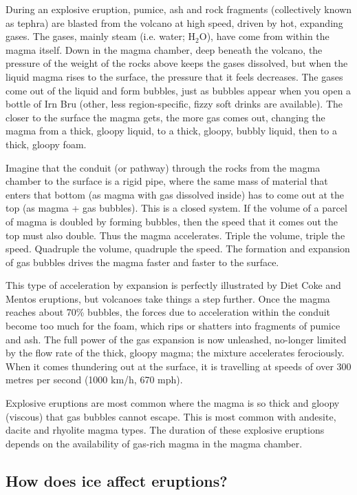 \documentclass[a4paper,11pt]{article}
\begin{document}
During an explosive eruption, pumice, ash and rock fragments (collectively known as tephra) are blasted from the volcano at high speed, driven by hot, expanding gases. The gases, mainly steam (i.e. water; H$_2$O), have come from within the magma itself. Down in the magma chamber, deep beneath the volcano, the pressure of the weight of the rocks above keeps the gases dissolved, but when the liquid magma rises to the surface, the pressure that it feels decreases. The gases come out of the liquid and form bubbles, just as bubbles appear when you open a bottle of Irn Bru (other, less region-specific, fizzy soft drinks are available). The closer to the surface the magma gets, the more gas comes out, changing the magma from a thick, gloopy liquid, to a thick, gloopy, bubbly liquid, then to a thick, gloopy foam.

Imagine that the conduit (or pathway) through the rocks from the magma chamber to the surface is a rigid pipe, where the same mass of material that enters that bottom (as magma with gas dissolved inside) has to come out at the top (as magma + gas bubbles). This is a closed system. If the volume of a parcel of magma is doubled by forming bubbles, then the speed that it comes out the top must also double. Thus the magma accelerates. Triple the volume, triple the speed.  Quadruple the volume, quadruple the speed. The formation and expansion of gas bubbles drives the magma faster and faster to the surface.

This type of acceleration by expansion is perfectly illustrated by Diet Coke and Mentos eruptions, but volcanoes take things a step further. Once the magma reaches about 70\% bubbles, the forces due to acceleration within the conduit become too much for the foam, which rips or shatters into fragments of pumice and ash. The full power of the gas expansion is now unleashed, no-longer limited by the flow rate of the thick, gloopy magma; the mixture accelerates ferociously. When it comes thundering out at the surface, it is travelling at speeds of over 300 metres per second (1000 km/h, 670 mph).

Explosive eruptions are most common where the magma is so thick and gloopy (viscous) that gas bubbles cannot escape. This is most common with andesite, dacite and rhyolite magma types. The duration of these explosive eruptions depends on the availability of gas-rich magma in the magma chamber.

\subsection{How does ice affect eruptions?}
\label{sec:surtsey}
\end{document}
